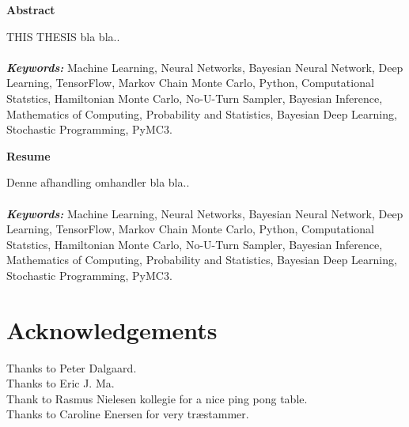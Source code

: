 \documentclass[a4paper]{book}
\providecommand{\keywords}[1]
{
  \small	
  \textbf{\textit{Keywords:}} #1
}
\numberwithin{mytheorem}{chapter}
\numberwithin{equation}{section}
\begin{document}
\thispagestyle{empty}
\begin{center}
    \Large
    \textbf{Abstract}
\end{center}
\vspace{0.9cm}
THIS THESIS bla bla.. 
\\
\\
\keywords{Machine Learning, Neural Networks, Bayesian Neural Network, Deep Learning, TensorFlow, Markov Chain Monte Carlo, Python, Computational Statstics, Hamiltonian Monte Carlo, No-U-Turn Sampler, Bayesian Inference, Mathematics of Computing, Probability and Statistics, Bayesian Deep Learning, Stochastic Programming, PyMC3.}
\frontmatter
\thispagestyle{empty}
\begin{center}
    \Large
    \textbf{Resume}
\end{center}
\vspace{0.9cm}
Denne afhandling omhandler bla bla..
\\
\\
\keywords{Machine Learning, Neural Networks, Bayesian Neural Network, Deep Learning, TensorFlow, Markov Chain Monte Carlo, Python, Computational Statstics, Hamiltonian Monte Carlo, No-U-Turn Sampler, Bayesian Inference, Mathematics of Computing, Probability and Statistics, Bayesian Deep Learning, Stochastic Programming, PyMC3.}
\frontmatter

\section*{Acknowledgements}
\thispagestyle{empty}
Thanks to Peter Dalgaard. \\
Thanks to Eric J. Ma.\\
Thank to Rasmus Nielesen kollegie for a nice ping pong table.\\
Thanks to Caroline Enersen for very træstammer.


\tableofcontents \thispagestyle{empty} 
\listoffigures \thispagestyle{empty} 
\listoftables \thispagestyle{empty} 
\newpage


\mainmatter















\nocite{*}


\end{document}
